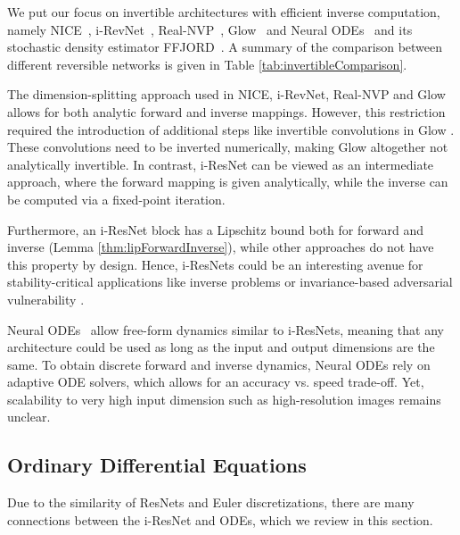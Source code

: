 \documentclass{article}
\begin{document}
We put our focus on invertible architectures with efficient inverse computation, namely NICE~\citep{dinh2014nice}, i-RevNet~\citep{jacobsen2018irevnet}, Real-NVP~\citep{dinh2016density}, Glow~\citep{kingma2018glow} and Neural ODEs~\citep{chen2018neural} and its stochastic density estimator FFJORD~\citep{ffjord}. A summary of the comparison between different reversible networks is given in Table \ref{tab:invertibleComparison}.

The dimension-splitting approach used in NICE, i-RevNet, Real-NVP and Glow allows for both analytic forward and inverse mappings. However, this restriction required the introduction of additional steps like invertible  convolutions in Glow \citep{kingma2018glow}. These  convolutions need to be inverted numerically, making Glow altogether not analytically invertible. In contrast, i-ResNet can be viewed as an intermediate approach, where the forward mapping is given analytically, while the inverse can be computed via a fixed-point iteration. 

Furthermore, an i-ResNet block has a Lipschitz bound both for forward and inverse (Lemma \ref{thm:lipForwardInverse}), while other approaches do not have this property by design. Hence, i-ResNets could be an interesting avenue for stability-critical applications like inverse problems \citep{ardizzone2018analyzing} or invariance-based adversarial vulnerability \citep{jacobsen2018excessive}. 

Neural ODEs~\citep{chen2018neural} allow free-form dynamics similar to i-ResNets, meaning that any architecture could be used as long as the input and output dimensions are the same. To obtain discrete forward and inverse dynamics, Neural ODEs rely on adaptive ODE solvers, which allows for an accuracy vs. speed trade-off. Yet, scalability to very high input dimension such as high-resolution images remains unclear. 


\iffalse
When applying the above methods to maximum likelihood-based generative modeling, the log-determinant is the key quantity to be computed. While Glow and Real-NVP allow non-volume preserving mappings, NICE is volume-preserving. Those approaches focus on efficient and exact computation of the log-determinant via a restriction to triangular Jacobians. FFJORD, on the other hand, makes use of Continuous Normalizing Flows \citep{chen2018neural} and relies on a stochastic estimation of the trace. Our approach requires an additional approximation of the matrix logarithm.
\fi
\subsection{Ordinary Differential Equations}
Due to the similarity of ResNets and Euler discretizations, there are many connections between the i-ResNet and ODEs, which we review in this section.
\end{document}

